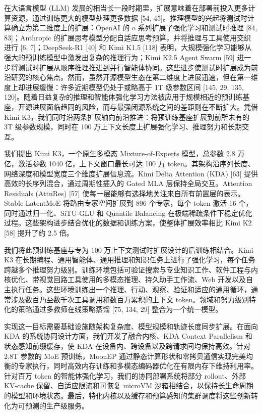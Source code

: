 \documentclass[
  10
]{article}
\begin{document}
在大语言模型 (LLM) 发展的相当长一段时期里，扩展意味着在部署前投入更多计算资源，通过训练更大的模型处理更多数据 [54, 45]。推理模型的兴起将测试时计算确立为第二维度上的扩展：OpenAI 的 o 系列扩展了强化学习和测试时推理 [84, 83]；Anthropic 的扩展思考模型分配自适应思考预算，并将推理与工具使用交织进行 [6, 7]；DeepSeek-R1 [40] 和 Kimi K1.5 [118] 表明，大规模强化学习能够从强大的预训练模型中激发出复杂的推理行为；Kimi K2.5 Agent Swarm [59] 进一步将测试时扩展从顺序推理推进到并行智能体协同。这些进步使测试时扩展成为前沿研究的核心焦点。然而，虽然开源模型生态在第二维度上进展迅速，但在第一维度上却进展缓慢：许多近期模型仍处于或略高于 1T 级参数区间 [145, 29, 135, 120]。随着日益复杂的推理和智能体强化学习方法被应用于规模相近的预训练基座，开源进展面临趋同的风险，而与最强闭源系统之间的差距则在不断扩大。凭借 Kimi K3，我们同时沿两条扩展轴向前沿推进：将预训练基座扩展到前所未有的 3T 级参数规模，同时在 100 万上下文长度上扩展强化学习、推理努力和长期交互。

我们提出 Kimi K3，一个原生多模态 Mixture-of-Experts 模型，总参数 2.8 万亿，激活参数 1040 亿，上下文窗口最长可达 100 万 token。其架构沿序列长度、网络深度和模型宽度三个维度扩展信息流。Kimi Delta Attention (KDA) [63] 提供高效的长序列混合，通过周期性插入的 Gated MLA 层保持全局交互。Attention Residuals (AttnRes) [57] 使每一层能够有选择地关注来自所有前置层的表示。Stable LatentMoE 将路由专家空间扩展到 896 个专家，每个 token 激活 16 个，同时通过归一化、SiTU-GLU 和 Quantile Balancing 在极端稀疏条件下稳定优化过程。这些架构进步结合优化的数据和训练方案，使整体扩展效率相比 Kimi K2 [58] 提升了约 2.5 倍。

我们将此预训练基座与专为 100 万上下文测试时扩展设计的后训练相结合。Kimi K3 在长期编程、通用智能体、通用推理和知识任务上进行了强化学习，每个任务跨越多个推理努力级别。训练环境包括可验证搜索与专业知识工作、软件工程与内核优化、带视觉回路工具使用的多模态推理、持久助手工作流、Web 开发以及自主执行任务。这些环境训练出一个推理、行动、观察、验证和适应的通用循环，通常涉及数百乃至数千次工具调用和数百万累积的上下文 token。领域和努力级别特化的策略通过多教师在线策略蒸馏 [75, 134, 29] 整合为一个统一模型。

实现这一目标需要基础设施随架构复杂度、模型规模和轨迹长度同步扩展。在面向 KDA 的系统协同设计方面，我们开发了融合内核、KDA Context Parallelism 和状态感知前缀缓存，使 KDA 在设备内、跨设备以及跨请求间均保持高效。针对 2.8T 参数的 MoE 预训练，MoonEP 通过静态计算形状和零拷贝通信实现完美均衡的专家执行，同时高效内存训练和多模态编码器优化在有限内存下维持利用率。针对百万 token 的智能体强化学习，我们的协同部署系统将部分 rollout、外部 KV-cache 保留、自适应限流和可恢复 microVM 沙箱相结合，以保持长生命周期的模型和环境状态。最后，特化内核以及缓存和预算感知的集群调度将这些创新转化为可预测的生产级服务。
\end{document}
